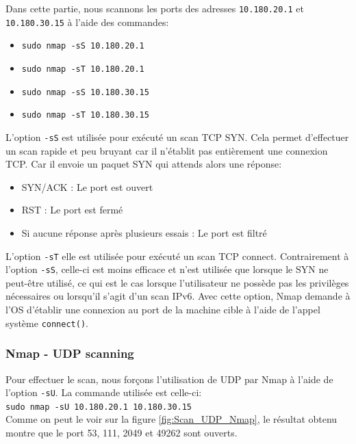 \documentclass[french,paper=a4,oneside,captions=tableheading]{article}
\begin{document}
Dans cette partie, nous scannons les ports des adresses \texttt{10.180.20.1} et \texttt{10.180.30.15} à l'aide des commandes:
\begin{itemize}
    \item \texttt{sudo nmap -sS 10.180.20.1}
    \item \texttt{sudo nmap -sT 10.180.20.1}
    \item \texttt{sudo nmap -sS 10.180.30.15}
    \item \texttt{sudo nmap -sT 10.180.30.15}
\end{itemize}
L'option \texttt{-sS} est utilisée pour exécuté un scan TCP SYN. Cela permet d'effectuer un scan rapide et peu bruyant car il n'établit pas entièrement une connexion TCP. Car il envoie un paquet SYN qui attends alors une réponse:
\begin{itemize}
    \item SYN/ACK : Le port est ouvert
    \item RST : Le port est fermé
    \item Si aucune réponse après plusieurs essais : Le port est filtré
\end{itemize}

L'option \texttt{-sT} elle est utilisée pour exécuté un scan TCP connect. Contrairement à l'option \texttt{-sS}, celle-ci est moins efficace et n'est utilisée que lorsque le SYN ne peut-être utilisé, ce qui est le cas lorsque l'utilisateur ne possède pas les privilèges nécessaires ou lorsqu'il s'agit d'un scan IPv6. Avec cette option, Nmap demande à l'OS d'établir une connexion au port de la machine cible à l'aide de l'appel système \texttt{connect()}.



\subsubsection{Nmap - UDP scanning}

Pour effectuer le scan, nous forçons l'utilisation de UDP par Nmap à l'aide de l'option \texttt{-sU}. La commande utilisée est celle-ci: \\

\texttt{sudo nmap -sU 10.180.20.1 10.180.30.15}\\
Comme on peut le voir sur la figure \ref{fig:Scan_UDP_Nmap}, le résultat obtenu montre que le port 53, 111, 2049 et 49262 sont ouverts.
\end{document}
